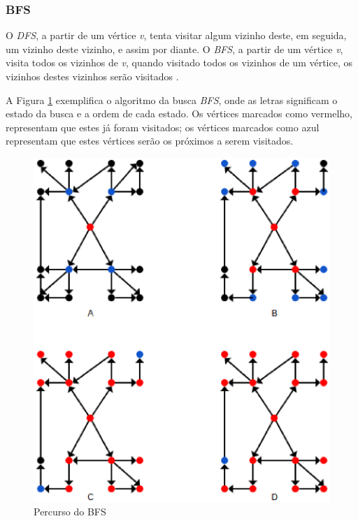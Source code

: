 \subsubsection{BFS}

O \textit{DFS}, a partir de um vértice \textit{v}, tenta visitar algum vizinho deste, em seguida, um vizinho deste vizinho, e assim por diante. O \textit{BFS}, a partir de um vértice \textit{v}, visita todos os vizinhos de \textit{v}, quando visitado todos os vizinhos de um vértice, os vizinhos destes vizinhos serão visitados \cite{Brassard:1988}.

A Figura \ref{bfs} exemplifica o algoritmo da busca \textit{BFS}, onde as letras significam o estado da busca e a ordem de cada estado. Os vértices marcados como vermelho, representam que estes já foram visitados; os vértices marcados como azul representam que estes vértices serão os próximos a serem visitados.

\begin{figure}[!h]
	\centering
	\includegraphics[scale=0.3]{figuras/capitulo2/bfs.eps}
	\caption{Percurso do BFS}
	\label{bfs}
\end{figure}

